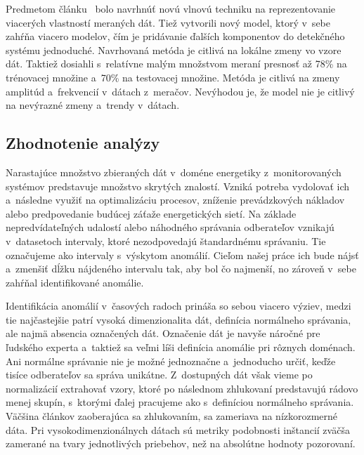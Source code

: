 \documentclass[a4paper,twoside,slovak,12pt,appendix]{article}
\begin{document}
\noindent
Predmetom článku~\cite{Tagaris2002} bolo navrhnúť novú vlnovú techniku na
reprezentovanie viacerých vlastností meraných dát. Tiež vytvorili nový model,
ktorý v~sebe zahŕňa viacero modelov, čím je pridávanie ďalších komponentov do
detekčného systému jednoduché. Navrhovaná metóda je citlivá na lokálne zmeny vo
vzore dát. Taktiež dosiahli s~relatívne malým množstvom meraní presnosť až 78\%
na trénovacej množine a~70\% na testovacej množine. Metóda je citlivá na zmeny
amplitúd a~frekvencií v~dátach z~meračov. Nevýhodou je, že model nie je citlivý
na nevýrazné zmeny a~trendy v~dátach.
\medskip


\subsection{Zhodnotenie analýzy}
Narastajúce množstvo zbieraných dát v~doméne energetiky z~monitorovaných
systémov predstavuje množstvo skrytých znalostí. Vzniká potreba vydolovať ich
a~následne využiť na optimalizáciu procesov, zníženie prevádzkových nákladov
alebo predpovedanie budúcej záťaže energetických sietí. Na základe
nepredvídateľných udalostí alebo náhodného správania odberateľov vznikajú
v~datasetoch intervaly, ktoré nezodpovedajú štandardnému správaniu. Tie
označujeme ako intervaly s~výskytom anomálií. Cieľom našej práce ich bude nájsť
a~zmenšiť dĺžku nájdeného intervalu tak, aby bol čo najmenší, no zároveň v~sebe
zahŕňal identifikované anomálie.

Identifikácia anomálií v~časových radoch prináša so sebou viacero výziev, medzi
tie najčastejšie patrí vysoká dimenzionalita dát, definícia normálneho správania,
ale najmä absencia označených dát. Označenie dát je navyše náročné pre ľudského
experta a~taktiež sa veľmi líši definícia anomálie pri rôznych doménach. Ani
normálne správanie nie je možné jednoznačne a~jednoducho určiť, keďže tisíce
odberateľov sa správa unikátne. Z~dostupných dát však vieme po normalizácií
extrahovať vzory, ktoré po následnom zhlukovaní predstavujú rádovo menej skupín,
s~ktorými ďalej pracujeme ako s~definíciou normálneho správania. Väčšina článkov
zaoberajúca sa zhlukovaním, sa zameriava na nízkorozmerné dáta. Pri
vysokodimenzionálnych dátach sú metriky podobnosti inštancií zväčša zamerané na
tvary jednotlivých priebehov, než na absolútne hodnoty pozorovaní.
\end{document}
